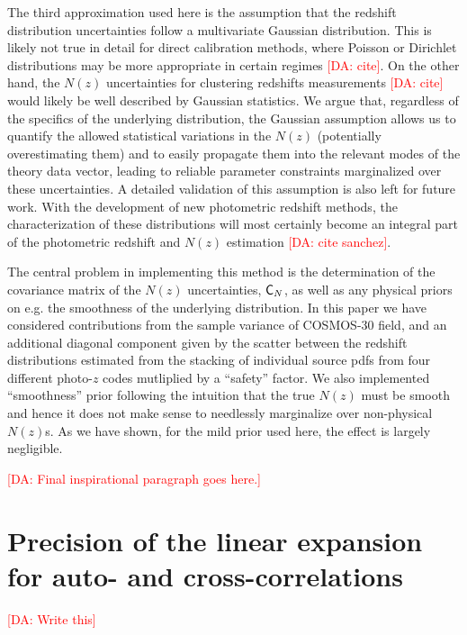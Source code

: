\documentclass[a4paper,11pt]{article}
\newcommand{\da}[1]{{\textcolor{red}{[DA: #1]}}}
\begin{document}
    The third approximation used here is the assumption that the redshift distribution uncertainties follow a multivariate Gaussian distribution. This is likely not true in detail for direct calibration methods, where Poisson or Dirichlet distributions may be more appropriate in certain regimes \da{cite}. On the other hand, the $N(z)$ uncertainties for clustering redshifts measurements \da{cite} would likely be well described by Gaussian statistics. We argue that, regardless of the specifics of the underlying distribution, the Gaussian assumption allows us to quantify the allowed statistical variations in the $N(z)$ (potentially overestimating them) and to easily propagate them into the relevant modes of the theory data vector, leading to reliable parameter constraints marginalized over these uncertainties. A detailed validation of this assumption is also left for future work. With the development of new photometric redshift methods, the characterization of these distributions will most certainly become an integral part of the photometric redshift and $N(z)$ estimation \da{cite sanchez}.

    The central problem in implementing this method is the determination of the covariance matrix of the $N(z)$ uncertainties, ${\sf C}_N$, as well as any physical priors on e.g. the smoothness of the underlying distribution. In this paper we have considered contributions from the sample variance of COSMOS-30 field, and an additional diagonal component given by the scatter between the redshift distributions estimated from the stacking of individual source pdfs from four different photo-$z$ codes mutliplied by a ``safety'' factor. We also implemented ``smoothness'' prior following the intuition that the true $N(z)$ must be smooth and hence it does not make sense to needlessly marginalize over non-physical $N(z)$s. As we have shown, for the mild prior used here, the effect is largely negligible.

    \da{Final inspirational paragraph goes here.}











\appendix
\section{Precision of the linear expansion for auto- and cross-correlations}\label{app:autos}
\da{Write this}


\end{document}
